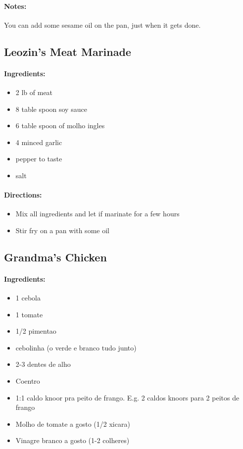 \documentclass{article}
\begin{document}
\paragraph{Notes:}You can add some sesame oil on the pan, just when it gets done.

\subsection{Leozin’s Meat Marinade}

\paragraph{Ingredients:}

\begin{itemize}
   \item 2 lb of meat
	\item 8 table spoon soy sauce
	\item 6 table spoon of molho ingles
	\item 4 minced garlic
	\item pepper to taste
	\item salt 
\end{itemize}

\paragraph{Directions:}
\begin{itemize}
	\item Mix all ingredients and let if marinate for a few hours
	\item Stir fry on a pan with some oil
\end{itemize}

\subsection{Grandma’s Chicken}

\paragraph{Ingredients:}
\begin{itemize}
	\item 1 cebola 
	\item 1 tomate 
	\item 1/2 pimentao 
	\item cebolinha (o verde e branco tudo junto) 
	\item 2-3 dentes de alho 
	\item Coentro 
	\item 1:1 caldo knoor pra peito de frango. E.g. 2 caldos knoors para 2 peitos de frango
	\item Molho de tomate a gosto (1/2 xicara)
	\item Vinagre branco a gosto (1-2 colheres)
\end{itemize}
\end{document}
